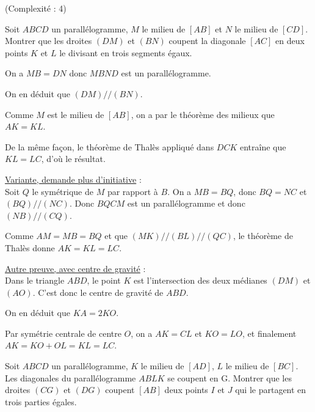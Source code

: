 \begin{exo}(Complexité : 4)

Soit $ABCD$ un parallélogramme, $M$ le milieu de $[AB]$ et $N$ le milieu de $[CD]$. Montrer que les droites $(DM)$ et $(BN)$ coupent la diagonale $[AC]$ en deux points $K$ et $L$ le divisant en trois segments égaux.

\begin{sol}
 On a $MB=DN$ donc $MBND$ est un parallélogramme.

 On en déduit que $(DM)//(BN)$.

 Comme $M$ est le milieu de $[AB]$, on a par le théorème des milieux que $AK=KL$.

 De la même façon, le théorème de Thalès appliqué dans $DCK$ entraîne que $KL=LC$, d'où le résultat.

\underline{Variante, demande plus d'initiative} :\\
Soit $Q$ le symétrique de $M$ par rapport à $B$. On a $MB=BQ$, donc $BQ=NC$ et $(BQ)//(NC)$. Donc $BQCM$ est un parallélogramme et donc $(NB)//(CQ)$.

Comme $AM=MB=BQ$ et que $(MK)//(BL)//(QC)$, le théorème de Thalès donne $AK=KL=LC$.

\underline{Autre preuve, avec centre de gravité} :\\
Dans le triangle $ABD$, le point $K$ est l'intersection des deux médianes $(DM)$ et $(AO)$. C'est donc le centre de gravité de $ABD$.

On en déduit que $KA = 2KO$.

Par symétrie centrale de centre $O$, on a $AK=CL$ et $KO=LO$, et finalement $AK = KO+OL = KL = LC$.
\end{sol}
\end{exo}


\begin{exo}
Soit $ABCD$ un parallélogramme, $K$ le milieu de $[AD]$, $L$ le milieu de $[BC]$.
Les diagonales du parallélogramme $ABLK$ se coupent en G.
Montrer que les droites $(CG)$ et $(DG)$ coupent $[AB]$ deux points $I$ et $J$ qui le partagent en trois parties égales.
\end{exo}


